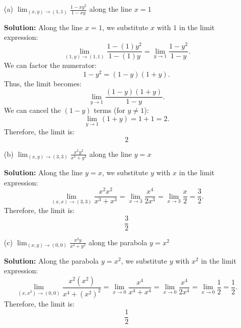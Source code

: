 \documentclass[reqno, 12pt]{amsart}
\begin{document}
\begin{itemize}
    \medskip
    \begin{itemize}
      \item[(a)] $\displaystyle\lim_{(x,y)\rightarrow (1,1)}\frac{1-xy^2}{1-xy}$ along the line $x=1$
        \newline

        \begin{answerbox}
          \textbf{Solution:} Along the line $x=1$, we substitute $x$ with $1$ in the limit expression:
          \[
            \lim_{(1,y) \to (1,1)} \frac{1 - (1)y^2}{1 - (1)y} = \lim_{y \to 1} \frac{1 - y^2}{1 - y}.
          \]
          We can factor the numerator:
          \[
            1 - y^2 = (1 - y)(1 + y).
          \]
          Thus, the limit becomes:
          \[
            \lim_{y \to 1} \frac{(1 - y)(1 + y)}{1 - y}.
          \]
          We can cancel the $(1 - y)$ terms (for $y \neq 1$):
          \[
            \lim_{y \to 1} (1 + y) = 1 + 1 = 2.
          \]
          Therefore, the limit is:
          \[
            2
          \]
        \end{answerbox}
        \vspace{0.5 in}

      \item[(b)] $\displaystyle\lim_{(x,y)\rightarrow(3,3)}\frac{x^2y^2}{x^3+y^3}$ along the line $y = x$
        \newline

        \begin{answerbox}
          \textbf{Solution:} Along the line $y = x$, we substitute $y$ with $x$ in the limit expression:
          \[
            \lim_{(x,x) \to (3,3)} \frac{x^2x^2}{x^3+x^3} = \lim_{x \to 3} \frac{x^4}{2x^3} = \lim_{x \to 3} \frac{x}{2} = \frac{3}{2}.
          \]
          Therefore, the limit is:
          \[
            \frac{3}{2}
          \]
        \end{answerbox}
        \vspace{0.5 in}

      \item[(c)] $\displaystyle\lim_{(x,y)\rightarrow(0,0)}\frac{x^2y}{x^4+y^2}$ along the parabola $y = x^2$
        \newline

        \begin{answerbox}
          \textbf{Solution:} Along the parabola $y = x^2$, we substitute $y$ with $x^2$ in the limit expression:
          \[
            \lim_{(x,x^2) \to (0,0)} \frac{x^2(x^2)}{x^4+(x^2)^2} = \lim_{x \to 0} \frac{x^4}{x^4+x^4} = \lim_{x \to 0} \frac{x^4}{2x^4} = \lim_{x \to 0} \frac{1}{2} = \frac{1}{2}.
          \]
          Therefore, the limit is:
          \[
            \frac{1}{2}
          \]
        \end{answerbox}
        \vspace{0.5 in}


\end{itemize}
\end{itemize}
\end{document}
